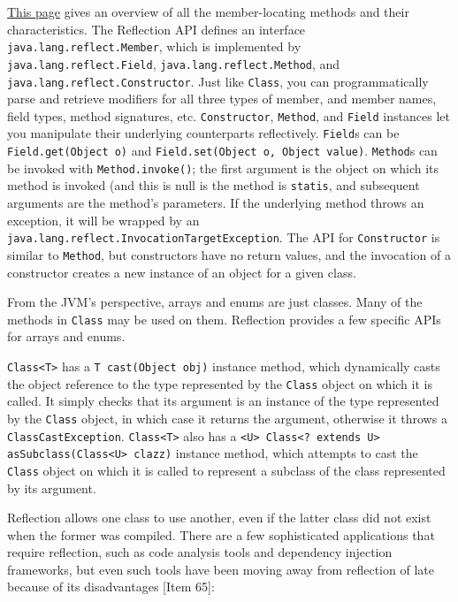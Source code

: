 \documentclass[table, xcdraw]{article}%
\begin{document}
\href{https://docs.oracle.com/javase/tutorial/reflect/class/classMembers.html}{This page} gives an overview of all the member-locating methods and their characteristics. The Reflection API defines an interface \texttt{java.lang.reflect.Member}, which is implemented by \texttt{java.lang.reflect.Field}, \texttt{java.lang.reflect.Method}, and \texttt{java.lang.reflect.Constructor}. Just like \texttt{Class}, you can programmatically parse and retrieve modifiers for all three types of member, and member names, field types, method signatures, etc. \texttt{Constructor}, \texttt{Method}, and \texttt{Field} instances let you manipulate their underlying counterparts reflectively. \texttt{Field}s can be \texttt{Field.get(Object o)} and \texttt{Field.set(Object o, Object value)}. \texttt{Method}s can be invoked with \texttt{Method.invoke()}; the first argument is the object on which its method is invoked (and this is null is the method is \texttt{statis}, and subsequent arguments are the method's parameters. If the underlying method throws an exception, it will be wrapped by an \texttt{java.lang.reflect.InvocationTargetException}. The API for \texttt{Constructor} is similar to \texttt{Method}, but constructors have no return values, and the invocation of a constructor creates a new instance of an object for a given class.

From the JVM's perspective, arrays and enums are just classes. Many of the methods in \texttt{Class} may be used on them. Reflection provides a few specific APIs for arrays and enums.

\texttt{Class<T>} has a \texttt{T cast(Object obj)} instance method, which dynamically casts the object reference to the type represented by the \texttt{Class} object on which it is called. It simply checks that its argument is an instance of the type represented by the \texttt{Class} object, in which case it returns the argument, otherwise it throws a \texttt{ClassCastException}. \texttt{Class<T>} also has a \texttt{<U> Class<? extends U> asSubclass(Class<U> clazz)} instance method, which attempts to cast the \texttt{Class} object on which it is called to represent a subclass of the class represented by its argument.

Reflection allows one class to use another, even if the latter class did not exist when the former was compiled. There are a few sophisticated applications that require reflection, such as code analysis tools and dependency injection frameworks, but even such tools
have been moving away from reflection of late because of its disadvantages [Item 65]:
\end{document}

